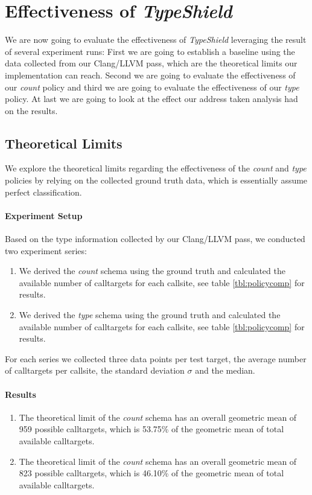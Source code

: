 \section{Effectiveness of \textit{TypeShield}}
\label{section:typeshieldeffectiveness}
We are now going to evaluate the effectiveness of \textit{TypeShield} leveraging the result of several experiment runs: First we are going to establish a baseline using the data collected from our Clang/LLVM pass, which are the theoretical limits our implementation can reach. Second we are going to evaluate the effectiveness of our \textit{count} policy and third we are going to evaluate the effectiveness of our \textit{type} policy. At last we are going to look at the effect our address taken analysis had on the results.

\subsection{Theoretical Limits}
\label{subsection:theoreticallimit}
We explore the theoretical limits regarding the effectiveness of the \textit{count} and \textit{type} policies by relying on the collected ground truth data, which is essentially assume perfect classification.

\paragraph{Experiment Setup} Based on the type information collected by our Clang/LLVM pass, we conducted two experiment series:
\begin{enumerate}
\item We derived the \textit{count} schema using the ground truth and calculated the available number of calltargets for each callsite, see table \ref{tbl:policycomp} for results.
\item We derived the \textit{type} schema using the ground truth and calculated the available number of calltargets for each callsite, see table \ref{tbl:policycomp} for results.
\end{enumerate}
For each series we collected three data points per test target, the average number of calltargets per callsite, the standard deviation $\sigma$ and the median.

\paragraph{Results}
\begin{enumerate}
\item The theoretical limit of the \textit{count} schema has an overall geometric mean of 959 possible calltargets, which is 53.75\% of the geometric mean of total available calltargets.
\item The theoretical limit of the \textit{count} schema has an overall geometric mean of 823 possible calltargets, which is 46.10\% of the geometric mean of total available calltargets.
\end{enumerate}

